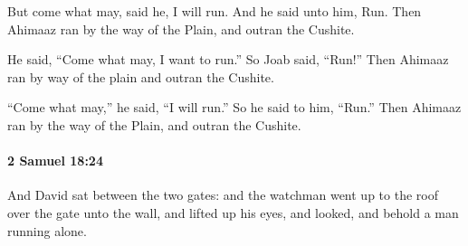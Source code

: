 			\begin{versebox}
					\item[BHS] 
					\item[ASV] But come what may, said he, I will run. And he said unto him, Run. Then Ahimaaz ran by the way of the Plain, and outran the Cushite.
					\item[NIV] He said, “Come what may, I want to run.” So Joab said, “Run!” Then Ahimaaz ran by way of the plain and outran the Cushite.
					\item[NRSV] “Come what may,” he said, “I will run.” So he said to him, “Run.” Then Ahimaaz ran by the way of the Plain, and outran the Cushite.
			\end{versebox}

		\paragraph{2 Samuel 18:24} %
			\label{2SAMUEL-18-24}

			And David sat between the two gates: and the watchman went up to the roof over the gate unto the wall, and lifted up his eyes, and looked, and behold a man running alone.

